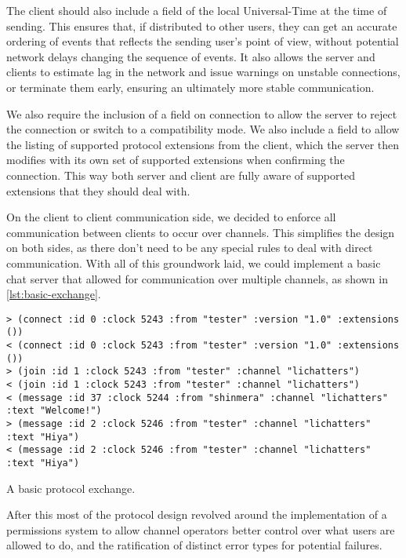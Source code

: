 \documentclass[format=sigconf]{acmart}
\begin{document}
The client should also include a  field of the local Universal-Time at the time of sending. This ensures that, if distributed to other users, they can get an accurate ordering of events that reflects the sending user's point of view, without potential network delays changing the sequence of events. It also allows the server and clients to estimate lag in the network and issue warnings on unstable connections, or terminate them early, ensuring an ultimately more stable communication.

We also require the inclusion of a  field on connection to allow the server to reject the connection or switch to a compatibility mode. We also include a  field to allow the listing of supported protocol extensions from the client, which the server then modifies with its own set of supported extensions when confirming the connection. This way both server and client are fully aware of supported extensions that they should deal with.

On the client to client communication side, we decided to enforce all communication between clients to occur over channels. This simplifies the design on both sides, as there don't need to be any special rules to deal with direct communication. With all of this groundwork laid, we could implement a basic chat server that allowed for communication over multiple channels, as shown in \autoref{lst:basic-exchange}.

\begin{listing}[h]
\begin{verbatim}
> (connect :id 0 :clock 5243 :from "tester" :version "1.0" :extensions ())
< (connect :id 0 :clock 5243 :from "tester" :version "1.0" :extensions ())
> (join :id 1 :clock 5243 :from "tester" :channel "lichatters")
< (join :id 1 :clock 5243 :from "tester" :channel "lichatters")
< (message :id 37 :clock 5244 :from "shinmera" :channel "lichatters" :text "Welcome!")
> (message :id 2 :clock 5246 :from "tester" :channel "lichatters" :text "Hiya")
< (message :id 2 :clock 5246 :from "tester" :channel "lichatters" :text "Hiya")
\end{verbatim}
\caption{A basic protocol exchange.}
\label{lst:basic-exchange}
\end{listing}

After this most of the protocol design revolved around the implementation of a permissions system to allow channel operators better control over what users are allowed to do, and the ratification of distinct error types for potential failures.
\end{document}
